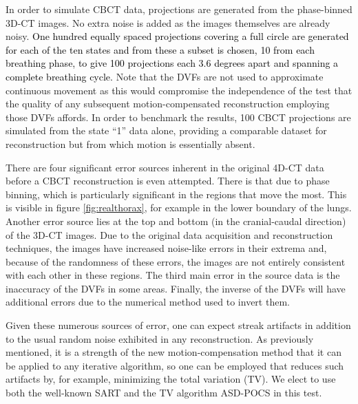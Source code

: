In order to simulate CBCT data, projections are generated from the phase-binned 3D-CT images.  No extra noise is added as the images themselves are already noisy.  \textcolor{black}{One hundred equally spaced projections covering a full circle are generated for each of the ten states and from these a subset is chosen, 10 from each breathing phase, to give 100 projections each 3.6 degrees apart and spanning a complete breathing cycle.}  Note that the DVFs are not used to approximate continuous movement as this would compromise the independence of the test that the quality of any subsequent motion-compensated reconstruction employing those DVFs affords.  In order to benchmark the results, 100 CBCT projections are simulated from the state ``1'' data alone, providing a comparable dataset for reconstruction but from which motion is essentially absent.

There are four significant error sources inherent in the original 4D-CT data before a CBCT reconstruction is even attempted.  There is that due to phase binning, which is particularly significant in the regions that move the most.  This is visible in figure \ref{fig:realthorax}, for example in the lower boundary of the lungs.  Another error source lies at the top and bottom (in the cranial-caudal direction) of the 3D-CT images.  Due to the original data acquisition and reconstruction techniques, the images have increased noise-like errors in their extrema and, because of the randomness of these errors, the images are not entirely consistent with each other in these regions.  The third main error in the source data is the inaccuracy of the DVFs in some areas.  Finally, the inverse of the DVFs will have additional errors due to the numerical method used to invert them.

Given these numerous sources of error, one can expect streak artifacts in addition to the usual random noise exhibited in any reconstruction.  As previously mentioned, it is a strength of the new motion-compensation method that it can be applied to any iterative algorithm, so one can be employed that reduces such artifacts by, for example, minimizing the total variation (TV).  We elect to use both the well-known SART and the TV algorithm ASD-POCS\cite{ASD_POCS} in this test.

